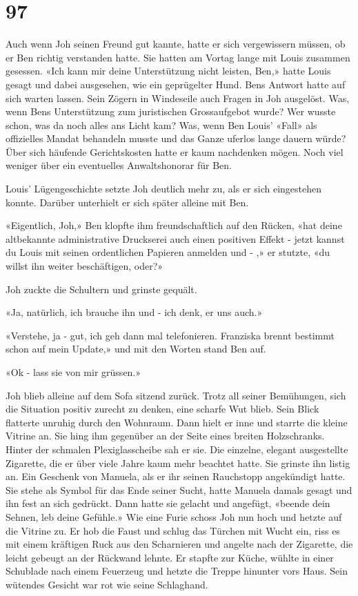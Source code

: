 \chapter{97}


\sectionbreak

Auch wenn Joh seinen Freund gut kannte, hatte er sich vergewissern
müssen, ob er Ben richtig verstanden hatte.
Sie hatten am Vortag lange mit Louis zusammen gesessen. 
«Ich kann mir deine Unterstützung nicht leisten, Ben,» hatte Louis 
gesagt und dabei ausgesehen, wie ein geprügelter Hund.
Bens Antwort hatte auf sich warten lassen. Sein Zögern in
Windeseile auch Fragen in Joh ausgelöst.
Was, wenn Bens Unterstützung zum juristischen Grossaufgebot wurde? Wer
wusste schon, was da noch alles ans Licht kam? Was, wenn Ben Louis’
«Fall» als offizielles Mandat behandeln musste und das Ganze uferlos
lange dauern würde?
Über sich häufende Gerichtskosten hatte er kaum nachdenken mögen.
Noch viel weniger über ein eventuelles Anwaltshonorar für Ben.

Louis’ Lügengeschichte setzte Joh deutlich mehr zu, als er sich eingestehen konnte. Darüber unterhielt er sich
später alleine mit Ben. 

«Eigentlich, Joh,» Ben klopfte ihm freundschaftlich auf den Rücken, «hat deine altbekannte administrative Druckserei auch einen positiven Effekt - jetzt kannst du Louis mit seinen ordentlichen Papieren anmelden und - ,» er stutzte, «du willst ihn weiter beschäftigen, oder?»

Joh zuckte die Schultern und grinste gequält.

«Ja, natürlich, ich brauche ihn und - ich denk, er uns auch.»

«Verstehe, ja - gut, ich geh dann mal telefonieren. Franziska brennt bestimmt schon auf mein Update,» und mit den Worten stand Ben auf.

«Ok - lass sie von mir grüssen.»

Joh blieb alleine auf dem Sofa sitzend zurück. Trotz all seiner Bemühungen, sich die Situation positiv zurecht zu denken, eine scharfe Wut blieb. Sein Blick flatterte unruhig durch den Wohnraum. Dann hielt er inne und starrte die kleine Vitrine an. Sie hing ihm gegenüber an der Seite eines breiten Holzschranks. Hinter der schmalen Plexiglasscheibe sah er sie. Die einzelne, elegant ausgestellte Zigarette, die er über viele Jahre kaum mehr beachtet hatte. Sie grinste ihn listig an. Ein Geschenk von Manuela, als er ihr seinen Rauchstopp angekündigt hatte. Sie stehe als Symbol für das Ende seiner Sucht, hatte Manuela damals gesagt und ihn fest an sich gedrückt. Dann hatte sie gelacht und angefügt, «beende dein Sehnen, leb deine Gefühle.» Wie eine Furie schoss Joh nun hoch und hetzte auf die Vitrine zu. Er hob die Faust und schlug das Türchen mit Wucht ein, riss es mit einem kräftigen Ruck aus den Scharnieren und angelte nach der Zigarette, die leicht gebeugt an der Rückwand lehnte. Er stapfte zur Küche, wühlte in einer Schublade nach einem Feuerzeug und hetzte die Treppe hinunter vors Haus. Sein wütendes Gesicht war rot wie seine Schlaghand.

